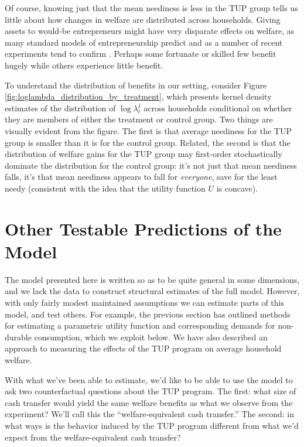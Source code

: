 \documentclass[11pt]{article}
\newcommand{\Fig}[1]{Figure \ref{fig:#1}} \newcommand{\Tab}[1]{Table \ref{tab:#1}}
\begin{document}
Of course, knowing just that the mean neediness is less in the TUP
group tells us little about how changes in welfare are distributed
across households.  Giving assets to would-be entrepreneurs might have
very disparate effects on welfare, as many standard models of
entrepreneurship predict
\citep{banerjee-newman93,paulson-etal06,karaivanov-townsend14} and as
a number of recent experiments tend to confirm \citep{demel-etal08,mckenzie-woodruff08,fafchamps-etal11}.
Perhaps some fortunate or skilled few benefit hugely while others
experience little benefit.  

To understand the distribution of benefits in our setting, consider
\Fig{loglambda_distribution_by_treatment}, which presents kernel
density estimates of the distribution of $\log\lambda^j_t$ across
households conditional on whether they are members of either the
treatment or control group.  Two things are visually evident from the
figure.  The first is that average neediness for the TUP group is
smaller than it is for the control group.  Related, the second is that
the distribution of welfare gains for the TUP group may first-order
stochastically dominate the distribution for the control group: it's
not just that mean neediness falls, it's that mean neediness appears
to fall for \emph{everyone}, save for the least needy (consistent with the
idea that the utility function $U$ is concave).  


\section*{Other Testable Predictions of the Model}
\label{sec-7}
The model presented here is written so as to be quite
general in some dimensions, and we lack the data to construct
structural estimates of the full model.  However, with only fairly
modest maintained assumptions we can estimate parts of this model,
and test others.  For example, the previous section has outlined
methods for estimating a parametric utility function and
corresponding demands for non-durable consumption, which we exploit
below.  We have also described an approach to measuring the effects
of the TUP program on average household welfare.

With what we've been able to estimate, we'd like to be able to use
the model to ask two counterfactual questions about the TUP
program.  The first: what size of cash transfer would yield the
same welfare benefits as what we observe from the experiment?
We'll call this the ``welfare-equivalent cash transfer.''  The
second: in what ways is the behavior induced by the TUP program
different from what we'd expect from the welfare-equivalent cash
transfer?
\end{document}
